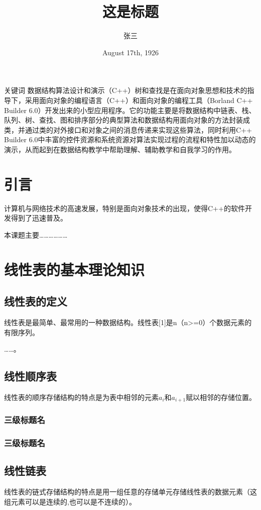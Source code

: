 \documentclass{upcthesis}
\title{这是标题}
\author{张三}
\date{August 17th, 1926}
\begin{document}
	\maketitle
	\begin{cnabstract}{关键词}
		数据结构算法设计和演示（C++）树和查找是在面向对象思想和技术的指导下，采用面向对象的编程语言（C++）和面向对象的编程工具（Borland C++ Builder 6.0）开发出来的小型应用程序。它的功能主要是将数据结构中链表、栈、队列、树、查找、图和排序部分的典型算法和数据结构用面向对象的方法封装成类，并通过类的对外接口和对象之间的消息传递来实现这些算法，同时利用C++ Builder 6.0中丰富的控件资源和系统资源对算法实现过程的流程和特性加以动态的演示，从而起到在数据结构教学中帮助理解、辅助教学和自我学习的作用。
	\end{cnabstract}

\tableofcontents

	\section{引言}
		计算机与网络技术的高速发展，特别是面向对象技术的出现，使得C++的软件开发得到了迅速普及。
		
		本课题主要………………
\section{线性表的基本理论知识}

\subsection{线性表的定义}
线性表是最简单、最常用的一种数据结构。线性表[1]是n（n>=0）个数据元素的有限序列。

……。
\subsection{线性顺序表}
线性表的顺序存储结构的特点是为表中相邻的元素$a_i$和$a_{i+1}$赋以相邻的存储位置。
\subsubsection{三级标题名}
\subsubsection{三级标题名}
\subsection{线性链表}
	线性表的链式存储结构的特点是用一组任意的存储单元存储线性表的数据元素（这组元素可以是连续的,也可以是不连续的）。
\end{document}
